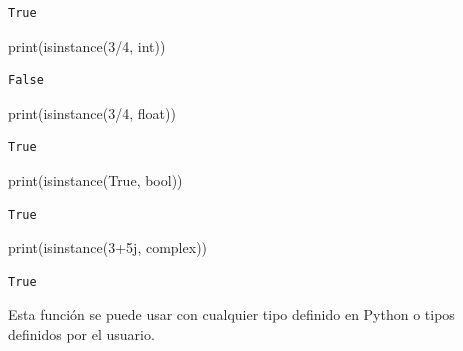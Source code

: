 \documentclass[
  spanish,
  letterpaper,
]{scrbook}
\newenvironment{Shaded}{\begin{snugshade}}{\end{snugshade}}
\newcommand{\BuiltInTok}[1]{\textcolor[rgb]{0.00,0.23,0.31}{#1}}
\newcommand{\DecValTok}[1]{\textcolor[rgb]{0.68,0.00,0.00}{#1}}
\newcommand{\NormalTok}[1]{\textcolor[rgb]{0.00,0.23,0.31}{#1}}
\newcommand{\OperatorTok}[1]{\textcolor[rgb]{0.37,0.37,0.37}{#1}}
\newcommand{\OtherTok}[1]{\textcolor[rgb]{0.00,0.23,0.31}{#1}}
\newcommand{\VariableTok}[1]{\textcolor[rgb]{0.07,0.07,0.07}{#1}}
\theoremstyle{definition}
\theoremstyle{remark}
\begin{document}
\begin{verbatim}
True
\end{verbatim}

\begin{Shaded}
\begin{Highlighting}[]
\BuiltInTok{print}\NormalTok{(}\BuiltInTok{isinstance}\NormalTok{(}\DecValTok{3}\OperatorTok{/}\DecValTok{4}\NormalTok{, }\BuiltInTok{int}\NormalTok{))}
\end{Highlighting}
\end{Shaded}

\begin{verbatim}
False
\end{verbatim}

\begin{Shaded}
\begin{Highlighting}[]
\BuiltInTok{print}\NormalTok{(}\BuiltInTok{isinstance}\NormalTok{(}\DecValTok{3}\OperatorTok{/}\DecValTok{4}\NormalTok{, }\BuiltInTok{float}\NormalTok{))}
\end{Highlighting}
\end{Shaded}

\begin{verbatim}
True
\end{verbatim}

\begin{Shaded}
\begin{Highlighting}[]
\BuiltInTok{print}\NormalTok{(}\BuiltInTok{isinstance}\NormalTok{(}\VariableTok{True}\NormalTok{, }\BuiltInTok{bool}\NormalTok{))}
\end{Highlighting}
\end{Shaded}

\begin{verbatim}
True
\end{verbatim}

\begin{Shaded}
\begin{Highlighting}[]
\BuiltInTok{print}\NormalTok{(}\BuiltInTok{isinstance}\NormalTok{(}\DecValTok{3}\OperatorTok{+}\OtherTok{5j}\NormalTok{, }\BuiltInTok{complex}\NormalTok{))}
\end{Highlighting}
\end{Shaded}

\begin{verbatim}
True
\end{verbatim}

Esta función se puede usar con cualquier tipo definido en Python o tipos
definidos por el usuario.
\end{document}
